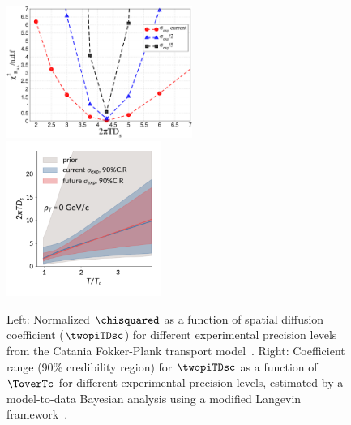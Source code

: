 

\begin{figure}[ht]
	\begin{center}
		\includegraphics[width=0.54\textwidth]{hf/figures/chi_Raa_Ds.pdf}
		\includegraphics[width=0.45\textwidth]{hf/figures/Plot_posterior_D2piT_calibrate_on_Duke-central_p0.pdf}
		\caption{Left: Normalized $\chisquared$ as a function of spatial diffusion coefficient ($\twopiTDsc$) for different experimental precision levels from the Catania Fokker-Plank transport model~\cite{Das:2015ana,Das:2013kea}. Right: Coefficient range (90\% credibility region) for $\twopiTDsc$ as a function of $\ToverTc$ for different experimental precision levels, estimated by a model-to-data Bayesian analysis using a modified Langevin framework~\cite{PhysRevC.97.014907}.}
		\label{fig:RAAv2.Dstheory}
	\end{center}
\end{figure}

